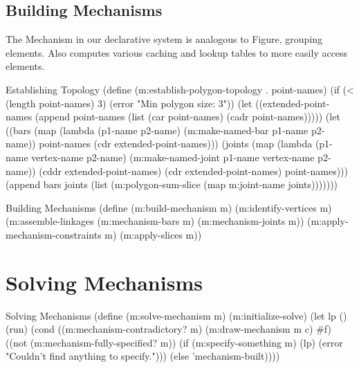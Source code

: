 \subsection{Building Mechanisms}

The Mechanism in our declarative system is analogous to Figure,
grouping elements. Also computes various caching and lookup tables to
more easily access elements.

\begin{code-listing}
[label=est-topo]
{Establishing Topology}
(define (m:establish-polygon-topology . point-names)
  (if (< (length point-names) 3)
      (error "Min polygon size: 3"))
  (let ((extended-point-names
         (append point-names
                 (list (car point-names) (cadr point-names)))))
    (let ((bars
           (map (lambda (p1-name p2-name)
                  (m:make-named-bar p1-name p2-name))
                point-names
                (cdr extended-point-names)))
          (joints
           (map (lambda (p1-name vertex-name p2-name)
                  (m:make-named-joint p1-name vertex-name p2-name))
                (cddr extended-point-names)
                (cdr extended-point-names)
                point-names)))
      (append bars joints
              (list (m:polygon-sum-slice
                     (map m:joint-name joints)))))))
\end{code-listing}

\begin{code-listing}
{Building Mechanisms}
(define (m:build-mechanism m)
  (m:identify-vertices m)
  (m:assemble-linkages (m:mechanism-bars m)
                       (m:mechanism-joints m))
  (m:apply-mechanism-constraints m)
  (m:apply-slices m))
\end{code-listing}

\section{Solving Mechanisms}

\begin{code-listing}
[label=solve-mechanism]
{Solving Mechanisms}
(define (m:solve-mechanism m)
  (m:initialize-solve)
  (let lp ()
    (run)
    (cond ((m:mechanism-contradictory? m)
           (m:draw-mechanism m c)
           #f)
          ((not (m:mechanism-fully-specified? m))
           (if (m:specify-something m)
               (lp)
               (error "Couldn't find anything to specify.")))
          (else 'mechanism-built))))
\end{code-listing}

